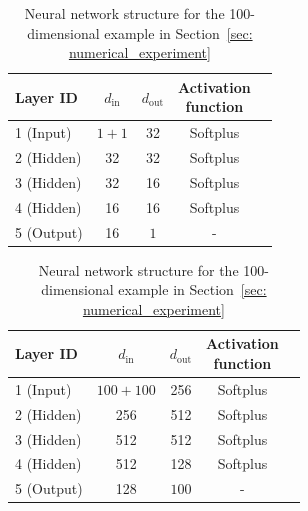 \documentclass[11pt]{article}
\begin{document}
\begin{table}[H]
    \begin{minipage}{0.45\linewidth}
	\centering
	\begin{tabular}{l | c c c c}
		\toprule
        Layer ID & $d_{\text{in}}$ & $d_{\text{out}}$ & \makecell{Activation\\ function}\\\hline
        1 (Input) & $1 + 1$ & 32 & Softplus\\
		2 (Hidden) & 32 & 32 & Softplus\\
		3 (Hidden) & 32& 16 & Softplus\\
        4 (Hidden) & 16 & 16 & Softplus\\
        5 (Output) & 16 & $1$ & - \\ \bottomrule
	\end{tabular}
	\caption{Neural network structure for the 1-dimensional examples in Sections~\ref{sec: numerical_experiment} and  \ref{sec:application}}
	\label{table: score_network_setting_1d}
	\end{minipage}%
    \hfill
    \begin{minipage}{0.45\linewidth}
	\centering
	\begin{tabular}{l | c c c c}
		\toprule
        Layer ID & $d_{\text{in}}$ & $d_{\text{out}}$ & \makecell{Activation\\ function}\\\hline
        1 (Input) & $100 + 100$ & 256 & Softplus\\
		2 (Hidden) & 256 & 512 & Softplus\\
		3 (Hidden) & 512 & 512 & Softplus\\
        4 (Hidden) & 512 & 128 & Softplus\\
        5 (Output) & 128 & $100$ & - \\ \bottomrule
	\end{tabular}
	\caption{Neural network structure for the 100-dimensional example in Section~\ref{sec: numerical_experiment}}
	\label{table: score_network_setting_100d}
	\end{minipage}%
\end{table}
\end{document}

